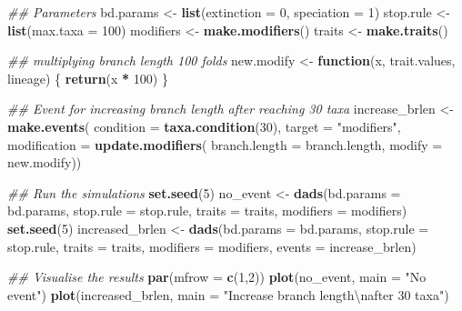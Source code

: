 \documentclass[]{book}
\newenvironment{Shaded}{\begin{snugshade}}{\end{snugshade}}
\newcommand{\CharTok}[1]{\textcolor[rgb]{0.31,0.60,0.02}{#1}}
\newcommand{\CommentTok}[1]{\textcolor[rgb]{0.56,0.35,0.01}{\textit{#1}}}
\newcommand{\ControlFlowTok}[1]{\textcolor[rgb]{0.13,0.29,0.53}{\textbf{#1}}}
\newcommand{\DataTypeTok}[1]{\textcolor[rgb]{0.13,0.29,0.53}{#1}}
\newcommand{\DecValTok}[1]{\textcolor[rgb]{0.00,0.00,0.81}{#1}}
\newcommand{\KeywordTok}[1]{\textcolor[rgb]{0.13,0.29,0.53}{\textbf{#1}}}
\newcommand{\NormalTok}[1]{#1}
\newcommand{\OperatorTok}[1]{\textcolor[rgb]{0.81,0.36,0.00}{\textbf{#1}}}
\newcommand{\StringTok}[1]{\textcolor[rgb]{0.31,0.60,0.02}{#1}}
\begin{document}
\begin{Shaded}
\begin{Highlighting}[]
\CommentTok{## Parameters}
\NormalTok{bd.params <-}\StringTok{ }\KeywordTok{list}\NormalTok{(}\DataTypeTok{extinction =} \DecValTok{0}\NormalTok{, }\DataTypeTok{speciation =} \DecValTok{1}\NormalTok{)}
\NormalTok{stop.rule <-}\StringTok{ }\KeywordTok{list}\NormalTok{(}\DataTypeTok{max.taxa =} \DecValTok{100}\NormalTok{)}
\NormalTok{modifiers <-}\StringTok{ }\KeywordTok{make.modifiers}\NormalTok{()}
\NormalTok{traits <-}\StringTok{ }\KeywordTok{make.traits}\NormalTok{()}

\CommentTok{## multiplying branch length 100 folds}
\NormalTok{new.modify <-}\StringTok{ }\ControlFlowTok{function}\NormalTok{(x, trait.values, lineage) \{}
  \KeywordTok{return}\NormalTok{(x }\OperatorTok{*}\StringTok{ }\DecValTok{100}\NormalTok{)}
\NormalTok{\}}

\CommentTok{## Event for increasing branch length after reaching 30 taxa}
\NormalTok{increase_brlen <-}\StringTok{ }\KeywordTok{make.events}\NormalTok{(}
                  \DataTypeTok{condition    =} \KeywordTok{taxa.condition}\NormalTok{(}\DecValTok{30}\NormalTok{),}
                  \DataTypeTok{target       =} \StringTok{"modifiers"}\NormalTok{,}
                  \DataTypeTok{modification =} \KeywordTok{update.modifiers}\NormalTok{(}
                                    \DataTypeTok{branch.length =}\NormalTok{ branch.length,}
                                    \DataTypeTok{modify =}\NormalTok{ new.modify))}

\CommentTok{## Run the simulations}
\KeywordTok{set.seed}\NormalTok{(}\DecValTok{5}\NormalTok{)}
\NormalTok{no_event <-}\StringTok{ }\KeywordTok{dads}\NormalTok{(}\DataTypeTok{bd.params =}\NormalTok{ bd.params,}
                 \DataTypeTok{stop.rule =}\NormalTok{ stop.rule,}
                 \DataTypeTok{traits    =}\NormalTok{ traits,}
                 \DataTypeTok{modifiers =}\NormalTok{ modifiers)}
\KeywordTok{set.seed}\NormalTok{(}\DecValTok{5}\NormalTok{)}
\NormalTok{increased_brlen <-}\StringTok{ }\KeywordTok{dads}\NormalTok{(}\DataTypeTok{bd.params =}\NormalTok{ bd.params,}
                        \DataTypeTok{stop.rule =}\NormalTok{ stop.rule,}
                        \DataTypeTok{traits    =}\NormalTok{ traits,}
                        \DataTypeTok{modifiers =}\NormalTok{ modifiers,}
                        \DataTypeTok{events    =}\NormalTok{ increase_brlen)}

\CommentTok{## Visualise the results}
\KeywordTok{par}\NormalTok{(}\DataTypeTok{mfrow =} \KeywordTok{c}\NormalTok{(}\DecValTok{1}\NormalTok{,}\DecValTok{2}\NormalTok{))}
\KeywordTok{plot}\NormalTok{(no_event, }\DataTypeTok{main =} \StringTok{"No event"}\NormalTok{)}
\KeywordTok{plot}\NormalTok{(increased_brlen, }\DataTypeTok{main =} \StringTok{"Increase branch length}\CharTok{\textbackslash{}n}\StringTok{after 30 taxa"}\NormalTok{)}
\end{Highlighting}
\end{Shaded}
\end{document}
